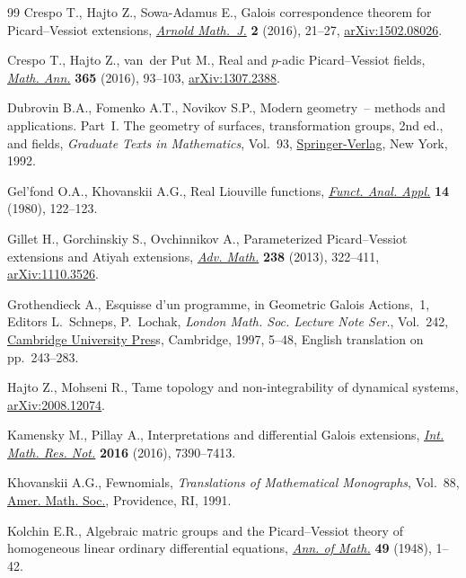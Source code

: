 \documentclass[10pt,a4paper]{amsart}
\numberwithin{equation}{section}
\begin{document}
\begin{thebibliography}{99}
Crespo T., Hajto Z., Sowa-Adamus E., Galois correspondence theorem for
 {P}icard--{V}essiot extensions, \href{https://doi.org/10.1007/s40598-015-0029-z}{\textit{Arnold Math.~J.}} \textbf{2} (2016),
 21--27, \href{https://arxiv.org/abs/1502.08026}{arXiv:1502.08026}.

Crespo T., Hajto Z., van~der Put M., Real and {$p$}-adic {P}icard--{V}essiot
 fields, \href{https://doi.org/10.1007/s00208-015-1272-2}{\textit{Math. Ann.}} \textbf{365} (2016), 93--103, \href{https://arxiv.org/abs/1307.2388}{arXiv:1307.2388}.

Dubrovin B.A., Fomenko A.T., Novikov S.P., Modern geometry~-- methods and
 applications. {P}art~{I}. The geometry of surfaces, transformation groups, 2nd ed.,
 and fields, \textit{Graduate Texts in Mathematics}, Vol.~93,
 \href{https://doi.org/10.1007/978-1-4612-4398-4}{Springer-Verlag}, New York, 1992.

Gel'fond O.A., Khovanskii A.G., Real {L}iouville functions, \href{https://doi.org/10.1007/BF01086557}{\textit{Funct.
 Anal. Appl.}} \textbf{14} (1980), 122--123.

Gillet H., Gorchinskiy S., Ovchinnikov A., Parameterized {P}icard--{V}essiot
 extensions and {A}tiyah extensions, \href{https://doi.org/10.1016/j.aim.2013.02.006}{\textit{Adv. Math.}} \textbf{238} (2013),
 322--411, \href{https://arxiv.org/abs/1110.3526}{arXiv:1110.3526}.

Grothendieck A., Esquisse d'un programme, in Geometric {G}alois Actions,~1,
 Editors L.~Schneps, P.~Lochak, \textit{London Math. Soc. Lecture Note Ser.},
 Vol.~242, \href{https://doi.org/10.1017/CBO9780511758874.003}{Cambridge University Pres}s, Cambridge, 1997, 5--48, {E}nglish translation on pp.~243--283.

Hajto Z., Mohseni R., Tame topology and non-integrability of dynamical systems,
 \href{https://arxiv.org/abs/2008.12074}{arXiv:2008.12074}.

Kamensky M., Pillay A., Interpretations and differential {G}alois extensions,
 \href{https://doi.org/10.1093/imrn/rnw019}{\textit{Int. Math. Res. Not.}} \textbf{2016} (2016), 7390--7413.

Khovanskii A.G., Fewnomials, \textit{Translations of Mathematical Monographs},
 Vol.~88, \href{https://doi.org/10.1090/mmono/088}{Amer. Math. Soc.}, Providence, RI, 1991.

Kolchin E.R., Algebraic matric groups and the {P}icard--{V}essiot theory of
 homogeneous linear ordinary differential equations, \href{https://doi.org/10.2307/1969111}{\textit{Ann. of Math.}}
 \textbf{49} (1948), 1--42.


\end{thebibliography}
\end{document}
